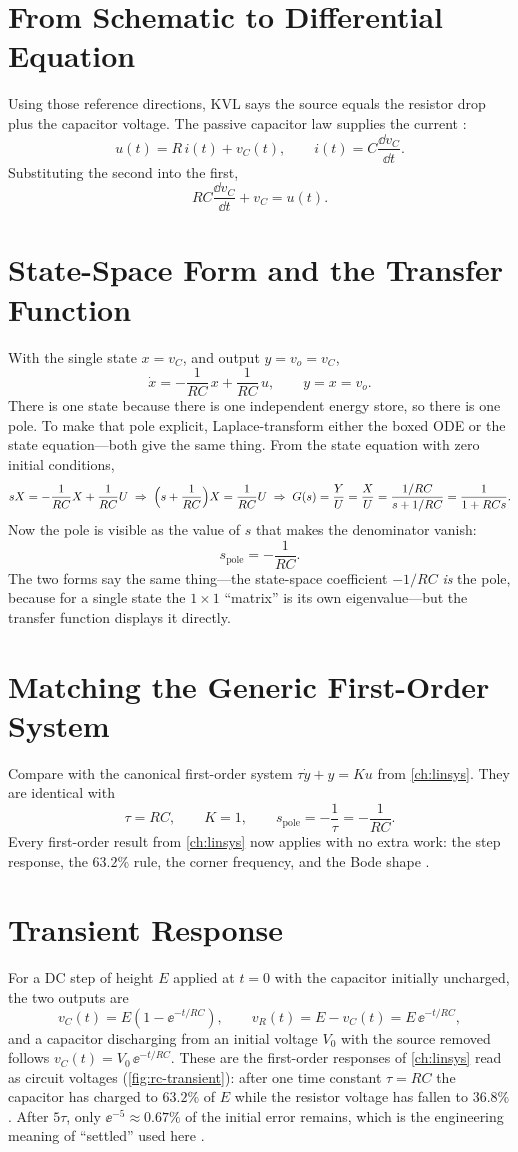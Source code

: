 \section{From Schematic to Differential Equation}
Using those reference directions, KVL says the source equals the resistor drop plus
the capacitor voltage. The passive capacitor law supplies the current
\cite[pp.~20--22]{white2004highfrequency}:
\[
u(t)=R\,i(t)+v_C(t),
\qquad
i(t)=C\frac{\dd v_C}{\dd t}.
\]
Substituting the second into the first,
\[
\boxed{\,RC\frac{\dd v_C}{\dd t}+v_C=u(t).\,}
\]

\section{State-Space Form and the Transfer Function}
With the single state \(x=v_C\), and output \(y=v_o=v_C\),
\[
\dot{x}=-\frac{1}{RC}\,x+\frac{1}{RC}\,u,
\qquad
y=x=v_o .
\]
There is one state because there is one independent energy store, so there is one
pole. To make that pole explicit, Laplace-transform either the boxed ODE or the
state equation---both give the same thing. From the state equation with zero
initial conditions,
\[
sX=-\frac{1}{RC}X+\frac{1}{RC}U
\;\Rightarrow\;
\Bigl(s+\frac{1}{RC}\Bigr)X=\frac{1}{RC}U
\;\Rightarrow\;
G(s)=\frac{Y}{U}=\frac{X}{U}=\frac{1/RC}{s+1/RC}=\frac{1}{1+RCs}.
\]
Now the pole is visible as the value of \(s\) that makes the denominator vanish:
\[
s_{\text{pole}}=-\frac{1}{RC}.
\]
The two forms say the same thing---the state-space coefficient \(-1/RC\) \emph{is}
the pole, because for a single state the \(1\times1\) ``matrix'' is its own
eigenvalue---but the transfer function displays it directly.

\section{Matching the Generic First-Order System}
Compare with the canonical first-order system \(\tau\dot y+y=Ku\) from
\cref{ch:linsys}. They are identical with
\[
\tau=RC,
\qquad
K=1,
\qquad
s_{\text{pole}}=-\frac{1}{\tau}=-\frac{1}{RC}.
\]
Every first-order result from \cref{ch:linsys} now applies with no extra work:
the step response, the \(63.2\%\) rule, the corner frequency, and the Bode shape
\cite[pp.~20--22]{white2004highfrequency}.

\section{Transient Response}
For a DC step of height \(E\) applied at \(t=0\) with the capacitor initially
uncharged, the two outputs are
\[
v_C(t)=E\left(1-\ee^{-t/RC}\right),
\qquad
v_R(t)=E-v_C(t)=E\,\ee^{-t/RC},
\]
and a capacitor discharging from an initial voltage \(V_0\) with the source removed
follows \(v_C(t)=V_0\,\ee^{-t/RC}\). These are the first-order responses of
\cref{ch:linsys} read as circuit voltages (\cref{fig:rc-transient}): after one time
constant \(\tau=RC\) the capacitor has charged to \(63.2\%\) of \(E\) while the
resistor voltage has fallen to \(36.8\%\). After \(5\tau\), only
\(\ee^{-5}\approx0.67\%\) of the initial error remains, which is the engineering
meaning of ``settled'' used here \cite[pp.~20--22]{white2004highfrequency}.

